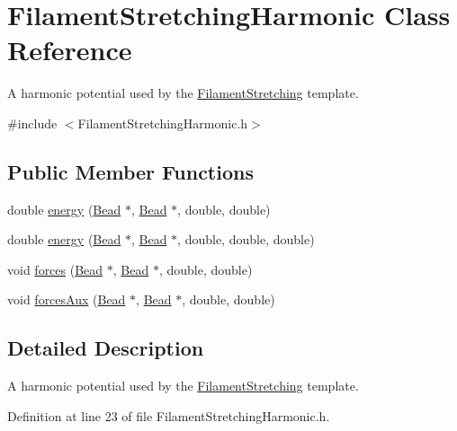 \hypertarget{classFilamentStretchingHarmonic}{\section{Filament\+Stretching\+Harmonic Class Reference}
\label{classFilamentStretchingHarmonic}
}


A harmonic potential used by the \hyperlink{classFilamentStretching}{Filament\+Stretching} template.  




{\ttfamily \#include $<$Filament\+Stretching\+Harmonic.\+h$>$}

\subsection*{Public Member Functions}
\begin{DoxyCompactItemize}
\item 
double \hyperlink{classFilamentStretchingHarmonic_aff23bb249779d685527d2c816e98bb2a}{energy} (\hyperlink{classBead}{Bead} $\ast$, \hyperlink{classBead}{Bead} $\ast$, double, double)
\item 
double \hyperlink{classFilamentStretchingHarmonic_a2abedb45d3a6e2af5aa5b1ff6169805a}{energy} (\hyperlink{classBead}{Bead} $\ast$, \hyperlink{classBead}{Bead} $\ast$, double, double, double)
\item 
void \hyperlink{classFilamentStretchingHarmonic_a68e2856173b29ab4c22103149bbb192f}{forces} (\hyperlink{classBead}{Bead} $\ast$, \hyperlink{classBead}{Bead} $\ast$, double, double)
\item 
void \hyperlink{classFilamentStretchingHarmonic_aae44c41221c571e3f12ad9f51b785547}{forces\+Aux} (\hyperlink{classBead}{Bead} $\ast$, \hyperlink{classBead}{Bead} $\ast$, double, double)
\end{DoxyCompactItemize}


\subsection{Detailed Description}
A harmonic potential used by the \hyperlink{classFilamentStretching}{Filament\+Stretching} template. 

Definition at line 23 of file Filament\+Stretching\+Harmonic.\+h.



